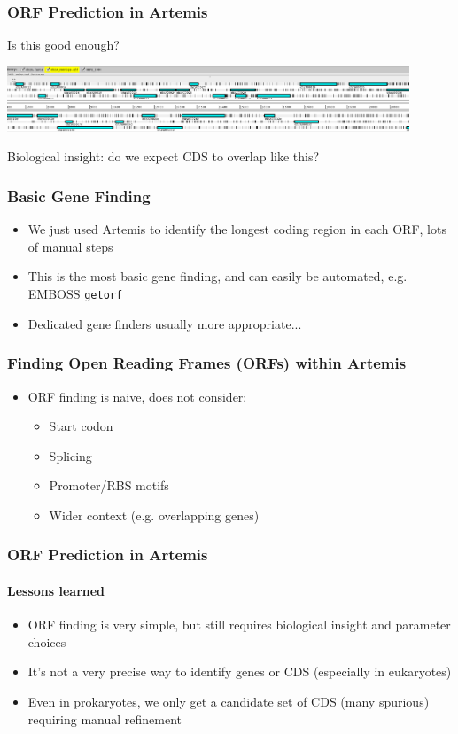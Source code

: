 \documentclass[table]{beamer}
\begin{document}
    \begin{frame}
      \frametitle{ORF Prediction in Artemis}   
      Is this good enough? 
      \begin{center}
        \includegraphics[width=0.9\textwidth]{images/artemis_orf14}     
      \end{center}
      Biological insight: do we expect CDS to overlap like this?
    \end{frame} 

\begin{frame}
    \frametitle{Basic Gene Finding}
    \begin{itemize}
      \item We just used Artemis to identify the longest coding region in each ORF, lots of manual steps
      \item This is the most basic gene finding, and can easily be automated, e.g. EMBOSS \texttt{getorf}
      \item Dedicated gene finders usually more appropriate...
    \end{itemize}
\end{frame}

\begin{frame}
    \frametitle{Finding Open Reading Frames (ORFs) within Artemis}
    \begin{itemize}
      \item<1-> ORF finding is naive, does not consider:
      \begin{itemize}
        \item Start codon
        \item Splicing
        \item Promoter/RBS motifs
        \item Wider context (e.g. overlapping genes)
      \end{itemize}
    \end{itemize}
\end{frame}

    \begin{frame}
      \frametitle{ORF Prediction in Artemis}   
      \framesubtitle{Lessons learned}   
      \begin{itemize}
        \item ORF finding is very simple, but still requires biological insight and parameter choices
        \item It's not a very precise way to identify genes or CDS (especially in eukaryotes)
        \item Even in prokaryotes, we only get a candidate set of CDS (many spurious) requiring manual refinement
      \end{itemize}
    \end{frame} 
\end{document}

